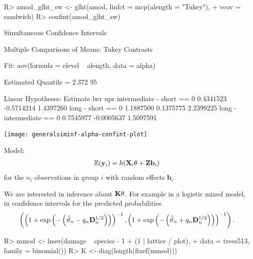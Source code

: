 \documentclass[landscape]{slides}
\begin{document}
\begin{Schunk}
\begin{Sinput}
R> amod_glht_sw <- glht(amod, linfct = mcp(alength = "Tukey"),
+                       vcov = sandwich)
R> confint(amod_glht_sw)
\end{Sinput}
\begin{Soutput}
	 Simultaneous Confidence Intervals

Multiple Comparisons of Means: Tukey Contrasts


Fit: aov(formula = elevel ~ alength, data = alpha)

Estimated Quantile = 2.372
95%
 

Linear Hypotheses:
                          Estimate   lwr        upr       
intermediate - short == 0  0.4341523 -0.5714214  1.4397260
long - short == 0          1.1887500  0.1375775  2.2399225
long - intermediate == 0   0.7545977 -0.0005637  1.5097591
\end{Soutput}
\end{Schunk}

\newpage

\begin{center}
\texttt{[image: generalsiminf-alpha-confint-plot]}
\end{center}  


Model:
\begin{eqnarray*}
\mathbb{E}(\mathbf{y}_i) = h(\mathbf{X}_i \theta + \mathbf{Z} \mathbf{b}_i)
\end{eqnarray*}
for the $n_i$ observations in group $i$ with random effects $\mathbf{b}_i$.

We are interested in inference about $\mathbf{K} \theta$. For example in a logistic mixed model, in
confidence intervals for the predicted probabilities
\begin{eqnarray*}
\left(\left(1 + \exp\left(- \left(\hat{\vartheta}_n - q_\alpha \mathbf{D}_n^{1/2}\right)\right)\right)^{-1},
\left(1 + \exp\left(- \left(\hat{\vartheta}_n + q_\alpha \mathbf{D}_n^{1/2}\right)\right)\right)^{-1}\right).
\end{eqnarray*}




\begin{Schunk}
\begin{Sinput}
R> mmod <- lmer(damage ~ species - 1 + (1 | lattice / plot),
+               data = trees513, family = binomial())
R> K <- diag(length(fixef(mmod)))
\end{Sinput}
\end{Schunk}
\end{document}
